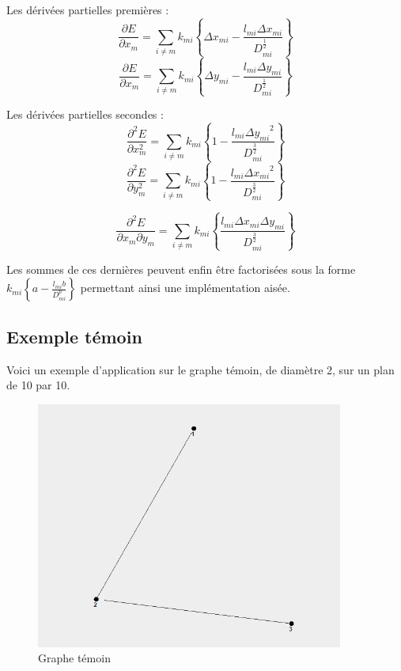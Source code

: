 \documentclass[a4paper,12pt]{article}
\begin{document}
Les dérivées partielles premières :
\begin{equation}
\frac{\partial E}{\partial x_m} = \sum_{i \ne m} k_{mi} \left\{ \Delta x_{mi} - \frac {l_{mi}\Delta x_{mi}}{D_{mi}^{\frac{1}{2}}} \right\}
\end{equation}
\begin{equation}
\frac{\partial E}{\partial x_m} = \sum_{i \ne m} k_{mi} \left\{ \Delta y_{mi} - \frac {l_{mi}\Delta y_{mi}}{D_{mi}^{\frac{1}{2}}} \right\}
\end{equation}

Les dérivées partielles secondes :
\begin{equation}
\frac{\partial^2 E}{\partial x^2_m} = \sum_{i \ne m} k_{mi} \left\{ 1 - \frac {l_{mi}{\Delta y_{mi}}^2}{D_{mi}^{\frac{3}{2}}} \right\}
\end{equation}
\begin{equation}
\frac{\partial^2 E}{\partial y^2_m} = \sum_{i \ne m} k_{mi} \left\{ 1 - \frac {l_{mi}{\Delta x_{mi}}^2}{D_{mi}^{\frac{3}{2}}} \right\}
\end{equation}

\begin{equation}
\frac{\partial^2 E}{\partial x_m \partial y_m} = \sum_{i \ne m} k_{mi} \left\{ \frac {l_{mi} \Delta x_{mi} \Delta y_{mi}}{D_{mi}^{\frac{3}{2}}} \right\}
\end{equation}

Les sommes de ces dernières peuvent enfin être factorisées sous la forme $k_{mi} \left\{ a - \frac {l_{mi}b}{D_{mi}^p} \right\}$ permettant ainsi une implémentation aisée.

\subsection{Exemple témoin}

Voici un exemple d'application sur le graphe témoin, de diamètre 2, sur un plan de 10 par 10.

\begin {figure}[H]
    \centering
    \includegraphics[width=0.9\textwidth]{temoin.png}
    \caption{Graphe témoin}
\end {figure}
\end{document}
